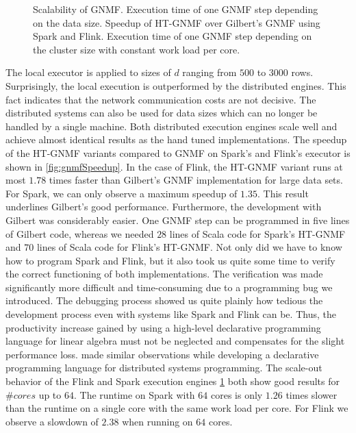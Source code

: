 \begin{figure}[htbp]
\begin{subfigure}{\dualpgfwidth}
		\caption{}
		\label{fig:nmfNodesRuntime}
	\end{subfigure}
	\caption{Scalability of GNMF.  Execution time of one GNMF step depending on the data size.  Speedup of HT-GNMF over Gilbert's GNMF using Spark and Flink.  Execution time of one GNMF step depending on the cluster size with constant work load per core.}
	\label{fig:nmfBenchmark}
\end{figure}

The local executor is applied to sizes of $d$ ranging from $500$ to $3000$ rows.
Surprisingly, the local execution is outperformed by the distributed engines.
This fact indicates that the network communication costs are not decisive.
The distributed systems can also be used for data sizes which can no longer be handled by a single machine.
Both distributed execution engines scale well and achieve almost identical results as the hand tuned implementations.
The speedup of the HT-GNMF variants compared to GNMF on Spark's and Flink's executor is shown in \cref{fig:gnmfSpeedup}.
In the case of Flink, the HT-GNMF variant runs at most $1.78$ times faster than Gilbert's GNMF implementation for large data sets.
For Spark, we can only observe a maximum speedup of $1.35$.
This result underlines Gilbert's good performance.
Furthermore, the development with Gilbert was considerably easier.
One GNMF step can be programmed in five lines of Gilbert code, whereas we needed $28$ lines of Scala code for Spark's HT-GNMF and $70$ lines of Scala code for Flink's HT-GNMF.
Not only did we have to know how to program Spark and Flink, but it also took us quite some time to verify the correct functioning of both implementations.
The verification was made significantly more difficult and time-consuming due to a programming bug we introduced.
The debugging process showed us quite plainly how tedious the development process even with systems like Spark and Flink can be.
Thus, the productivity increase gained by using a high-level declarative programming language for linear algebra must not be neglected and compensates for the slight performance loss.
\cite{alvaro:2010a} made similar observations while developing a declarative programming language for distributed systems programming.
The scale-out behavior of the Flink and Spark execution engines \cref{fig:nmfNodesRuntime} both show good results for $\#cores$ up to $64$.
The runtime on Spark with $64$ cores is only $1.26$ times slower than the runtime on a single core with the same work load per core.
For Flink we observe a slowdown of $2.38$ when running on $64$ cores.

